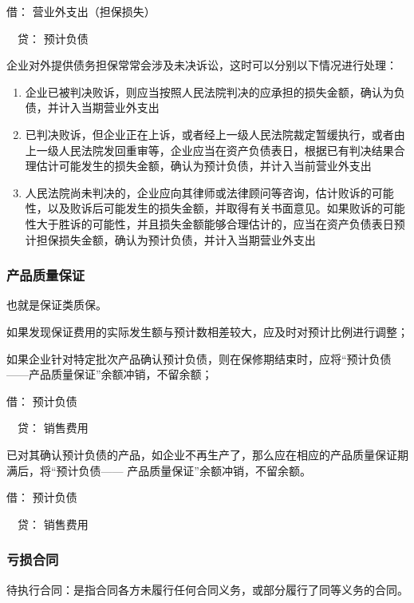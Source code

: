 \documentclass[UTF8,12pt]{ctexart}
\newenvironment{Dr}{\noindent 借：}{\par}
\newenvironment{Cr}{\noindent \ \ 贷：}{\par}
\numberwithin{equation}{section} %
\numberwithin{figure}{section}
\numberwithin{table}{section}
\begin{document}
	\begin{Dr}
		营业外支出（担保损失）
	\end{Dr}
	\begin{Cr}
		预计负债
	\end{Cr}

	企业对外提供债务担保常常会涉及未决诉讼，这时可以分别以下情况进行处理：
	\begin{enumerate}
		\item 企业已被判决败诉，则应当按照人民法院判决的应承担的损失金额，确认为负债，并计入当期营业外支出
		
		\item 已判决败诉，但企业正在上诉，或者经上一级人民法院裁定暂缓执行，或者由上一级人民法院发回重审等，企业应当在资产负债表日，根据已有判决结果合理估计可能发生的损失金额，确认为预计负债，并计入当前营业外支出

		\item 人民法院尚未判决的，企业应向其律师或法律顾问等咨询，估计败诉的可能性，以及败诉后可能发生的损失金额，并取得有关书面意见。如果败诉的可能性大于胜诉的可能性，并且损失金额能够合理估计的，应当在资产负债表日预计担保损失金额，确认为预计负债，并计入当期营业外支出
	\end{enumerate}
	
	
	\subsubsection{产品质量保证}
	也就是保证类质保。
	
	如果发现保证费用的实际发生额与预计数相差较大，应及时对预计比例进行调整；
	
	如果企业针对特定批次产品确认预计负债，则在保修期结束时，应将“预计负债——产品质量保证”余额冲销，不留余额；
	
	\begin{Dr}
		预计负债
	\end{Dr}
	\begin{Cr}
		销售费用
	\end{Cr}
	
	已对其确认预计负债的产品，如企业不再生产了，那么应在相应的产品质量保证期满后，将“预计负债—— 产品质量保证”余额冲销，不留余额。
	
	\begin{Dr}
		预计负债
	\end{Dr}
	\begin{Cr}
		销售费用
	\end{Cr}

	
	\subsubsection{亏损合同}
	待执行合同：是指合同各方未履行任何合同义务，或部分履行了同等义务的合同。
	
\end{document}

